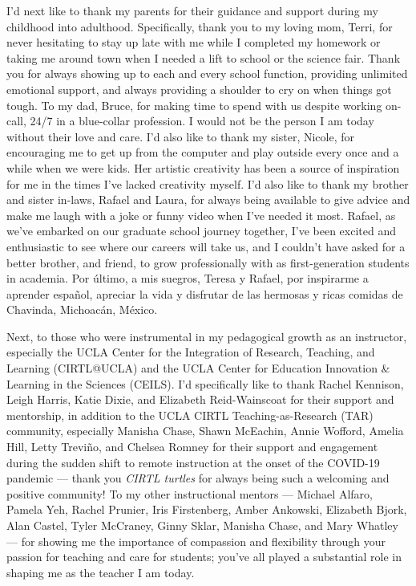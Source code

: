 {I'd next like to thank my parents for their guidance and support during my childhood into adulthood. Specifically, thank you to my loving mom, Terri, for never hesitating to stay up late with me while I completed my homework or taking me around town when I needed a lift to school or the science fair. Thank you for always showing up to each and every school function, providing unlimited emotional support, and always providing a shoulder to cry on when things got tough. To my dad, Bruce, for making time to spend with us despite working on-call, 24/7 in a blue-collar profession. I would not be the person I am today without their love and care. I'd also like to thank my sister, Nicole, for encouraging me to get up from the computer and play outside every once and a while when we were kids. Her artistic creativity has been a source of inspiration for me in the times I've lacked creativity myself. I'd also like to thank my brother and sister in-laws, Rafael and Laura, for always being available to give advice and make me laugh with a joke or funny video when I've needed it most. Rafael, as we've embarked on our graduate school journey together, I've been excited and enthusiastic to see where our careers will take us, and I couldn't have asked for a better brother, and friend, to grow professionally with as first-generation students in academia. Por último, a mis suegros, Teresa y Rafael, por inspirarme a aprender español, apreciar la vida y disfrutar de las hermosas y ricas comidas de Chavinda, Michoacán, México.

Next, to those who were instrumental in my pedagogical growth as an instructor, especially the UCLA Center for the Integration of Research, Teaching, and Learning (CIRTL@UCLA) and the UCLA Center for Education Innovation \& Learning in the Sciences (CEILS). I'd specifically like to thank Rachel Kennison, Leigh Harris, Katie Dixie, and Elizabeth Reid-Wainscoat for their support and mentorship, in addition to the UCLA CIRTL Teaching-as-Research (TAR) community, especially Manisha Chase, Shawn McEachin, Annie Wofford, Amelia Hill, Letty Treviño, and Chelsea Romney for their support and engagement during the sudden shift to remote instruction at the onset of the COVID-19 pandemic --- thank you \emph{CIRTL turtles} for always being such a welcoming and positive community! To my other instructional mentors --- Michael Alfaro, Pamela Yeh, Rachel Prunier, Iris Firstenberg, Amber Ankowski, Elizabeth Bjork, Alan Castel, Tyler McCraney, Ginny Sklar, Manisha Chase, and Mary Whatley  --- for showing me the importance of compassion and flexibility through your passion for teaching and care for students; you've all played a substantial role in shaping me as the teacher I am today.

}
